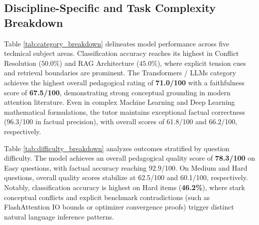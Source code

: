 \documentclass[conference]{IEEEtran}
\begin{document}
\subsection{Discipline-Specific and Task Complexity Breakdown}
Table \ref{tab:category_breakdown} delineates model performance across five technical subject areas. Classification accuracy reaches its highest in Conflict Resolution ($50.0\%$) and RAG Architecture ($45.0\%$), where explicit tension cues and retrieval boundaries are prominent. The Transformers / LLMs category achieves the highest overall pedagogical rating of \textbf{71.0/100} with a faithfulness score of \textbf{67.5/100}, demonstrating strong conceptual grounding in modern attention literature. Even in complex Machine Learning and Deep Learning mathematical formulations, the tutor maintains exceptional factual correctness (96.3/100 in factual precision), with overall scores of 61.8/100 and 66.2/100, respectively.

\begin{table}[htbp]
\caption{Performance Breakdown across Academic Subject Categories}
\label{tab:category_breakdown}
\centering
{}
\end{table}

Table \ref{tab:difficulty_breakdown} analyzes outcomes stratified by question difficulty. The model achieves an overall pedagogical quality score of \textbf{78.3/100} on Easy questions, with factual accuracy reaching 92.9/100. On Medium and Hard questions, overall quality scores stabilize at 62.5/100 and 60.1/100, respectively. Notably, classification accuracy is highest on Hard items (\textbf{46.2\%}), where stark conceptual conflicts and explicit benchmark contradictions (such as FlashAttention IO bounds or optimizer convergence proofs) trigger distinct natural language inference patterns.
\end{document}
